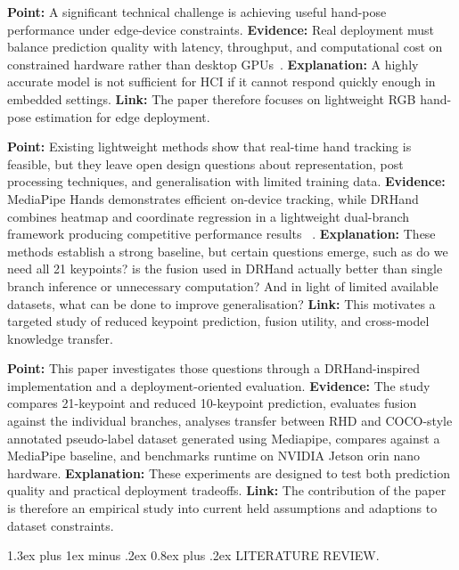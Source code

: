\documentclass[10pt,letterpaper]{article}
\makeatletter
\renewcommand\section{\@startsection{section}{1}{\z@}%
  {1.3ex plus 1ex minus .2ex}%
  {0.8ex plus .2ex}%
  {\centering\normalfont\small\scshape}}
\makeatother
\begin{document}
\medskip
\noindent\textbf{Point:} A significant technical challenge is achieving useful hand-pose performance under edge-device constraints.
\textbf{Evidence:} Real deployment must balance prediction quality with latency, throughput, and computational cost on constrained hardware rather than desktop GPUs~\cite{attentionlite,srhandnet,dualreg}.
\textbf{Explanation:} A highly accurate model is not sufficient for HCI if it cannot respond quickly enough in embedded settings.
\textbf{Link:} The paper therefore focuses on lightweight RGB hand-pose estimation for edge deployment.

\medskip
\noindent\textbf{Point:} Existing lightweight methods show that real-time hand tracking is feasible, but they leave open design questions about representation, post processing techniques, and generalisation with limited training data.
\textbf{Evidence:} MediaPipe Hands demonstrates efficient on-device tracking, while DRHand combines heatmap and coordinate regression in a lightweight dual-branch framework producing competitive performance results ~\cite{mediapipe,dualreg}.
\textbf{Explanation:} These methods establish a strong baseline, but certain questions emerge, such as do we need all 21 keypoints? is the fusion used in DRHand actually better than single branch inference or unnecessary computation? And in light of limited available datasets, what can be done to improve generalisation? 
\textbf{Link:} This motivates a targeted study of reduced keypoint prediction, fusion utility, and cross-model knowledge transfer.

\medskip
\noindent\textbf{Point:} This paper investigates those questions through a DRHand-inspired implementation and a deployment-oriented evaluation.
\textbf{Evidence:} The study compares 21-keypoint and reduced 10-keypoint prediction, evaluates fusion against the individual branches, analyses transfer between RHD and COCO-style annotated pseudo-label dataset generated using Mediapipe, compares against a MediaPipe baseline, and benchmarks runtime on NVIDIA Jetson orin nano hardware.
\textbf{Explanation:} These experiments are designed to test both prediction quality and practical deployment tradeoffs.
\textbf{Link:} The contribution of the paper is therefore an empirical study into current held assumptions and adaptions to dataset constraints.

\section{LITERATURE REVIEW}.
\end{document}
